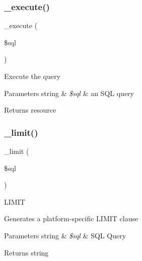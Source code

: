 \subsubsection{\texorpdfstring{\+\_\+execute()}{\_execute()}}
{\footnotesize\ttfamily \+\_\+execute (\begin{DoxyParamCaption}\item[{}]{\$sql }\end{DoxyParamCaption})\hspace{0.3cm}{\ttfamily [protected]}}

Execute the query


\begin{DoxyParams}[1]{Parameters}
string & {\em \$sql} & an S\+QL query \\
\hline
\end{DoxyParams}
\begin{DoxyReturn}{Returns}
resource 
\end{DoxyReturn}
\mbox{\label{class_c_i___d_b__postgre__driver_a3a02ea06541b8ecc25a33a61651562c8}} 
\subsubsection{\texorpdfstring{\+\_\+limit()}{\_limit()}}
{\footnotesize\ttfamily \+\_\+limit (\begin{DoxyParamCaption}\item[{}]{\$sql }\end{DoxyParamCaption})\hspace{0.3cm}{\ttfamily [protected]}}

L\+I\+M\+IT

Generates a platform-\/specific L\+I\+M\+IT clause


\begin{DoxyParams}[1]{Parameters}
string & {\em \$sql} & S\+QL Query \\
\hline
\end{DoxyParams}
\begin{DoxyReturn}{Returns}
string 
\end{DoxyReturn}
\mbox{\label{class_c_i___d_b__postgre__driver_a7ccb7f9c301fe7f0a9db701254142b63}} 
